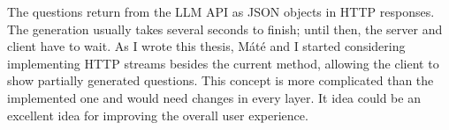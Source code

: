 The questions return from the LLM API as JSON objects in HTTP responses. The generation usually takes several seconds to finish; until then, the server and client have to wait. As I wrote this thesis, Máté and I started considering implementing HTTP streams besides the current method, allowing the client to show partially generated questions. This concept is more complicated than the implemented one and would need changes in every layer. It idea could be an excellent idea for improving the overall user experience.